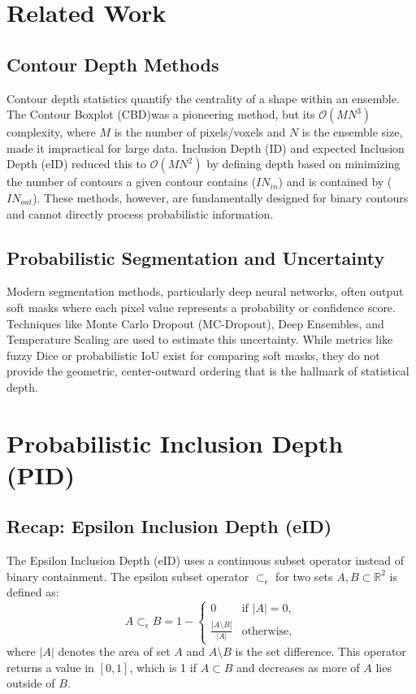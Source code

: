 \documentclass[review,journal]{vgtc}              %
\begin{document}
\section{Related Work}
\subsection{Contour Depth Methods}
Contour depth statistics quantify the centrality of a shape within an ensemble. The Contour Boxplot (CBD)was a pioneering method, but its $\mathcal{O}(MN^3)$ complexity, where $M$ is the number of pixels/voxels and $N$ is the ensemble size, made it impractical for large data. Inclusion Depth (ID) and expected Inclusion Depth (eID) reduced this to $\mathcal{O}(MN^2)$ by defining depth based on minimizing the number of contours a given contour contains ($IN_{in}$) and is contained by ($IN_{out}$). These methods, however, are fundamentally designed for binary contours and cannot directly process probabilistic information.

\subsection{Probabilistic Segmentation and Uncertainty}
Modern segmentation methods, particularly deep neural networks, often output soft masks where each pixel value represents a probability or confidence score. Techniques like Monte Carlo Dropout (MC-Dropout), Deep Ensembles, and Temperature Scaling are used to estimate this uncertainty. While metrics like fuzzy Dice or probabilistic IoU exist for comparing soft masks, they do not provide the geometric, center-outward ordering that is the hallmark of statistical depth.

\section{Probabilistic Inclusion Depth (PID)}

\subsection{Recap: Epsilon Inclusion Depth (eID)}
The Epsilon Inclusion Depth (eID) uses a continuous subset operator instead of binary containment. The epsilon subset operator $\subset_{\epsilon}$ for two sets $A, B \subset \mathbb{R}^2$ is defined as:
\begin{equation}
A \subset_{\epsilon} B = 1 - 
\begin{cases} 
0 & \text{if } |A| = 0, \\
\frac{|A \setminus B|}{|A|} & \text{otherwise},
\end{cases}
\end{equation}
where $|A|$ denotes the area of set $A$ and $A \setminus B$ is the set difference. This operator returns a value in $[0, 1]$, which is 1 if $A \subset B$ and decreases as more of $A$ lies outside of $B$.
\end{document}
